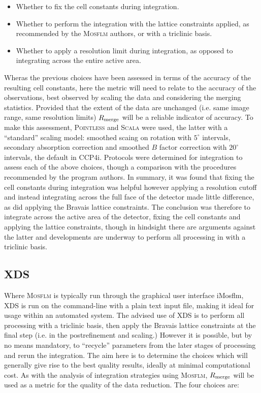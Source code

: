 \documentclass[preprint,pdf]{iucr}
\begin{document}
\begin{itemize}
\item{Whether to fix the cell constants during integration.}
\item{Whether to perform the integration with the lattice constraints
    applied, as recommended by the \textsc{Mosflm} authors, or with a triclinic
    basis.}
\item{Whether to apply a resolution limit during integration,
    as opposed to integrating across the entire active area.}
\end{itemize}

Wheras the previous choices have been assessed in terms of the accuracy
of the resulting cell constants, here the metric will need to relate
to the accuracy of the observations, best observed by scaling the data
and considering the merging statistics. Provided that the extent of
the data are unchanged (i.e. same image range, same resolution limits)
$R_{\rm{merge}}$ will be a reliable indicator of accuracy. To make
this assessment, \textsc{Pointless} \cite{Evans:ba5084} and \textsc{Scala} were
used, the latter with a ``standard'' scaling model: smoothed
scaing on rotation with $5^{\circ}$ intervals, secondary absorption
correction and smoothed $B$ factor correction with $20^{\circ}$
intervals, the default in CCP4i.
Protocols were determined for integration to assess each
of the above choices, though a 
comparison with the procedures recommended
by the program authors. In summary, it was found that fixing the cell
constants during integration was helpful however applying a resolution
cutoff and instead integrating across the full face of the detector
made little difference, as did applying the Bravais lattice 
constraints. The conclusion was therefore to integrate across the
active area of the detector, fixing the cell constants and applying
the lattice constraints, though in hindsight there are arguments
against the latter and developments are underway to perform all
processing in with a triclinic basis.

\subsection{XDS}

Where \textsc{Mosflm} is typically run through the graphical user interface
iMosflm, XDS is run on the command-line with a plain text input file,
making it ideal for usage 
within an automated system. The advised use of XDS is to perform all
processing with a triclinic basis, then apply the Bravais lattice
constraints at the final step (i.e. in the postrefinement and scaling.) However it
is possible, but by no means mandatory, to ``recycle'' parameters from
the later stages of processing and rerun the integration. The aim here
is to determine the choices which will generally give rise to the best
quality results, ideally at minimal computational cost. As with the
analysis of integration strategies using \textsc{Mosflm}, $R_{\rm{merge}}$ will
be used as a metric for the quality of the data reduction. The four
choices are:
\end{document}

